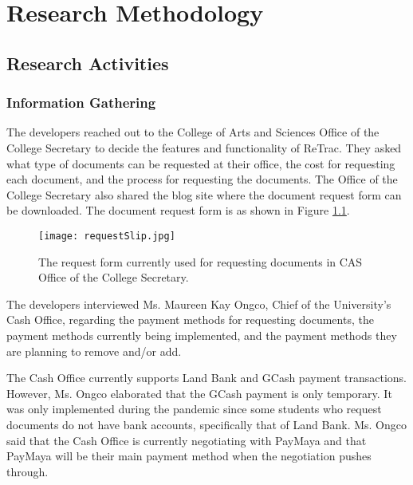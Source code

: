 \chapter{Research Methodology}

\section{Research Activities}

\subsection{Information Gathering}
The developers reached out to the College of Arts and Sciences Office of the College Secretary to decide the features and functionality of ReTrac. They asked what type of documents can be requested at their office, the cost for requesting each document, and the process for requesting the documents. The Office of the College Secretary also shared the blog site where the document request form can be downloaded. The document request form is as shown in Figure \ref{fig:requestSlip}.
\begin{figure}[hb!]
  \caption{\label{fig:requestSlip} The request form currently used for requesting documents in CAS Office of the College Secretary.}
  \texttt{[image: requestSlip.jpg]}
\end{figure}

The developers interviewed Ms. Maureen Kay Ongco, Chief of the University's Cash Office, regarding the payment methods for requesting documents, the payment methods currently being implemented, and the payment methods they are planning to remove and/or add. 

The Cash Office currently supports Land Bank and GCash payment transactions. However, Ms. Ongco elaborated that the GCash payment is only temporary. It was only implemented during the pandemic since some students who request documents do not have bank accounts, specifically that of Land Bank. Ms. Ongco said that the Cash Office is currently negotiating with PayMaya and that PayMaya will be their main payment method when the negotiation pushes through.


